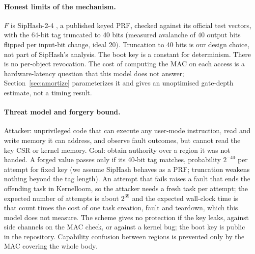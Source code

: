 \documentclass[10pt,a4paper]{article}
\begin{document}
\paragraph{Honest limits of the mechanism.} $F$ is SipHash-2-4 \citep{siphash}, a published keyed PRF, checked against its official test vectors, with the 64-bit tag truncated to 40 bits (measured avalanche \Avalanche{} of 40 output bits flipped per input-bit change, ideal 20). Truncation to 40 bits is our design choice, not part of SipHash's analysis. The boot key is a constant for determinism. There is no per-object revocation. The cost of computing the MAC on each access is a hardware-latency question that this model does not answer; Section~\ref{sec:amortize} parameterizes it and gives an unoptimised gate-depth estimate, not a timing result.
\paragraph{Threat model and forgery bound.} Attacker: unprivileged code that can execute any user-mode instruction, read and write memory it can address, and observe fault outcomes, but cannot read the key CSR or kernel memory. Goal: obtain authority over a region it was not handed. A forged value passes only if its 40-bit tag matches, probability $2^{-40}$ per attempt for fixed key (we assume SipHash behaves as a PRF; truncation weakens nothing beyond the tag length). An attempt that fails raises a fault that ends the offending task in Kernelloom, so the attacker needs a fresh task per attempt; the expected number of attempts is about $2^{39}$ and the expected wall-clock time is that count times the cost of one task creation, fault and teardown, which this model does not measure. The scheme gives no protection if the key leaks, against side channels on the MAC check, or against a kernel bug; the boot key is public in the repository. Capability confusion between regions is prevented only by the MAC covering the whole body.
\end{document}
